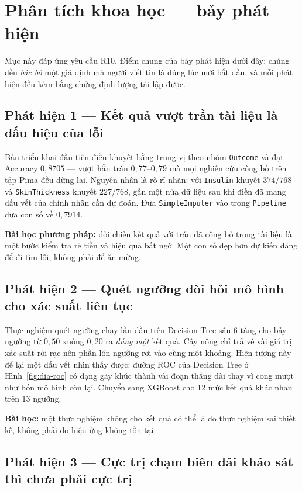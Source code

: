 \section{Phân tích khoa học --- bảy phát hiện}
\label{sec:phantich}

Mục này đáp ứng yêu cầu R10. Điểm chung của bảy phát hiện dưới đây: chúng đều
\emph{bác bỏ} một giả định mà người viết tin là đúng lúc mới bắt đầu, và mỗi
phát hiện đều kèm bằng chứng định lượng tái lập được.

\subsection{Phát hiện 1 --- Kết quả vượt trần tài liệu là dấu hiệu của lỗi}

Bản triển khai đầu tiên điền khuyết bằng trung vị theo nhóm \texttt{Outcome} và
đạt Accuracy $0{,}8705$ --- vượt hẳn trần $0{,}77$--$0{,}79$ mà mọi nghiên cứu
công bố trên tập Pima đều dừng lại. Nguyên nhân là rò rỉ nhãn: với
\texttt{Insulin} khuyết $374/768$ và \texttt{SkinThickness} khuyết $227/768$,
gần một nửa dữ liệu sau khi điền đã mang dấu vết của chính nhãn cần dự đoán.
Đưa \texttt{SimpleImputer} vào trong \texttt{Pipeline} đưa con số về $0{,}7914$.

\textbf{Bài học phương pháp:} đối chiếu kết quả với trần đã công bố trong tài
liệu là một bước kiểm tra rẻ tiền và hiệu quả bất ngờ. Một con số đẹp hơn dự
kiến đáng để đi tìm lỗi, không phải để ăn mừng.

\subsection{Phát hiện 2 --- Quét ngưỡng đòi hỏi mô hình cho xác suất liên tục}

Thực nghiệm quét ngưỡng chạy lần đầu trên Decision Tree sâu 6 tầng cho bảy
ngưỡng từ $0{,}50$ xuống $0{,}20$ ra \emph{đúng một} kết quả. Cây nông chỉ trả
về vài giá trị xác suất rời rạc nên phần lớn ngưỡng rơi vào cùng một khoảng.
Hiện tượng này để lại một dấu vết nhìn thấy được: đường ROC của Decision Tree ở
Hình~\ref{fig:dia-roc} có dạng gãy khúc thành vài đoạn thẳng dài thay vì cong
mượt như bốn mô hình còn lại. Chuyển sang XGBoost cho 12 mức kết quả khác nhau
trên 13 ngưỡng.

\textbf{Bài học:} một thực nghiệm không cho kết quả có thể là do thực nghiệm sai
thiết kế, không phải do hiệu ứng không tồn tại.

\subsection{Phát hiện 3 --- Cực trị chạm biên dải khảo sát thì chưa phải cực trị}

